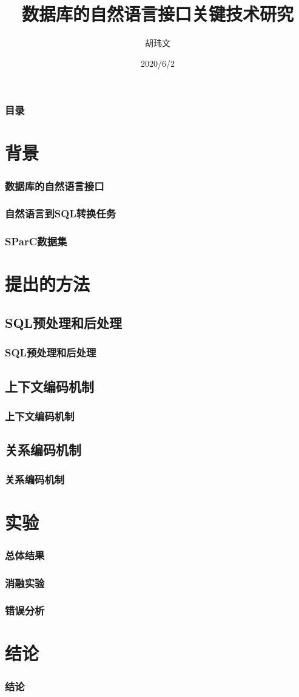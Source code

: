 \documentclass{ctexbeamer}
\title[数据库的自然语言接口]{数据库的自然语言接口关键技术研究}
\author{胡玮文}
\institute[SCUT]{华南理工大学}
\date{2020/6/2}
\begin{document}
\frame{\titlepage}

\begin{frame}
  \frametitle{目录}
  \tableofcontents
\end{frame}

\section{背景}
\begin{frame}
  \frametitle{数据库的自然语言接口}
\end{frame}
\begin{frame}
  \frametitle{自然语言到SQL转换任务}
\end{frame}
\begin{frame}
  \frametitle{SParC数据集}
\end{frame}

\section{提出的方法}
\subsection{SQL预处理和后处理}
\begin{frame}
  \frametitle{SQL预处理和后处理}
\end{frame}

\subsection{上下文编码机制}
\begin{frame}
  \frametitle{上下文编码机制}
\end{frame}

\subsection{关系编码机制}
\begin{frame}
  \frametitle{关系编码机制}
\end{frame}

\section{实验}
\begin{frame}
  \frametitle{总体结果}
\end{frame}
\begin{frame}
  \frametitle{消融实验}
\end{frame}
\begin{frame}
  \frametitle{错误分析}
\end{frame}

\section{结论}
\begin{frame}
  \frametitle{结论}
\end{frame}
\end{document}
